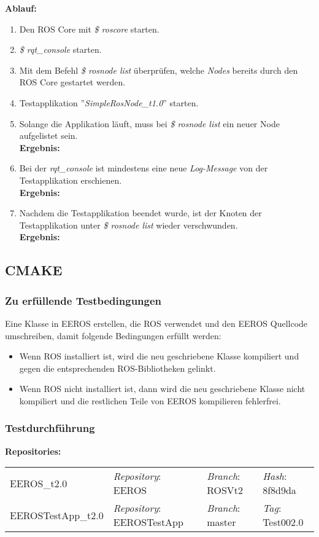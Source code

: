 \textbf{Ablauf: }
\begin{enumerate}
\item Den ROS Core mit \textit{\$ roscore} starten.
\item \textit{\$ rqt\_console} starten.
\item Mit dem Befehl \textit{\$ rosnode list} überprüfen, welche \textit{Nodes} bereits durch den ROS Core gestartet werden. 
\item Testapplikation ''\textit{SimpleRosNode\_t1.0}'' starten.
\item Solange die Applikation läuft, muss bei \textit{\$ rosnode list} ein neuer Node aufgelistet sein. \\
\textbf{Ergebnis:} \checkmark
\item Bei der \textit{rqt\_console} ist mindestens eine neue \textit{Log-Message} von der Testapplikation erschienen. \\
\textbf{Ergebnis:} \checkmark
\item Nachdem die Testapplikation beendet wurde, ist der Knoten der Testapplikation unter \textit{\$ rosnode list} wieder verschwunden. \\
\textbf{Ergebnis:} \checkmark
\end{enumerate}


\subsection{CMAKE}
\subsubsection{Zu erfüllende Testbedingungen}
Eine Klasse in EEROS erstellen, die ROS verwendet und den EEROS Quellcode umschreiben, damit folgende Bedingungen erfüllt werden:
\begin{itemize}
\item Wenn ROS installiert ist, wird die neu geschriebene Klasse kompiliert und gegen die entsprechenden ROS-Bibliotheken gelinkt.
\item Wenn ROS nicht installiert ist, dann wird die neu geschriebene Klasse nicht kompiliert und die restlichen Teile von EEROS kompilieren fehlerfrei.
\end{itemize}

\subsubsection{Testdurchführung}
\textbf{Repositories:} \\
\begin{tabular}
  { l						| l			 							l								 l								}

  EEROS\_t2.0				& \textit{Repository}: EEROS			& \textit{Branch}: ROSVt2		& \textit{Hash}: 8f8d9da		\\
  EEROSTestApp\_t2.0		& \textit{Repository}: EEROSTestApp	& \textit{Branch}: master		& \textit{Tag}: Test002.0 		\\
\end{tabular}

